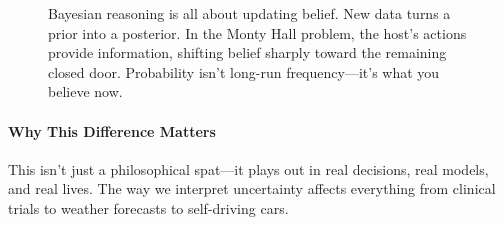 \begin{figure}[H]
\caption{Bayesian reasoning is all about updating belief. New data turns a prior into a posterior. In the Monty Hall problem, the host’s actions provide information, shifting belief sharply toward the remaining closed door. Probability isn’t long-run frequency—it’s what you believe now.}
\end{figure}












\paragraph{Why This Difference Matters}

This isn’t just a philosophical spat—it plays out in real decisions, real models, and real lives. The way we interpret uncertainty affects everything from clinical trials to weather forecasts to self-driving cars.

